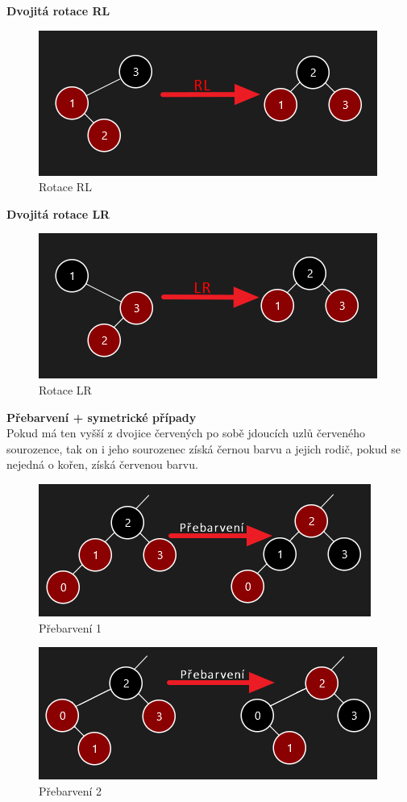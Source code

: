 \documentclass[
  biblatex=false,
  font=serif,
  glossaries=false,
  tables=false,
  theorems=false,
  index
]{kidiplom}
\begin{document}
\newpage
\noindent\textbf{Dvojitá rotace RL}
\begin{figure}[h!]
\centering
	\includegraphics[scale=0.8]{obrazky/20RL.png}
	\caption{Rotace RL}
\end{figure}

\noindent\textbf{Dvojitá rotace LR}
\begin{figure}[h!]
\centering
	\includegraphics[scale=0.8]{obrazky/21LR.png}
	\caption{Rotace LR}
\end{figure}

\noindent\textbf{Přebarvení + symetrické případy}\\
Pokud má ten vyšší z dvojice červených po sobě jdoucích uzlů červeného sourozence, tak on i jeho sourozenec získá černou barvu a jejich rodič, pokud se nejedná o kořen, získá červenou barvu.\\
\begin{figure}[h!]
\centering
	\includegraphics[scale=0.8]{obrazky/22Prebarveni.png}
	\caption{Přebarvení 1}
\end{figure}

\begin{figure}[h!]
\centering
	\includegraphics[scale=0.8]{obrazky/23Prebarveni.png}
	\caption{Přebarvení 2}
\end{figure}
\end{document}
